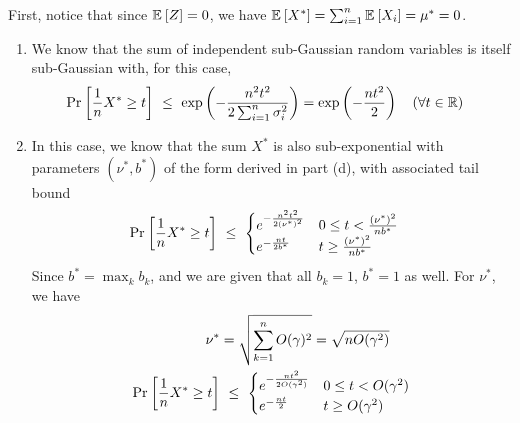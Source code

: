 \documentclass[11pt]{article}
\newcommand{\1}{\mathbb{I}} %
\begin{document}

First, notice that since $\mathbb{E}_{}\left[Z\right] = 0$, we have $\mathbb{E}_{}\left[X^*\right] = \sum_{i=1}^{n} \mathbb{E}_{}\left[X_i\right] = \mu^* = 0$. 

\begin{enumerate}
	\item {} We know that the sum of independent sub-Gaussian random variables is itself sub-Gaussian with, for this case,
	\begin{align}
		\text{Pr}_{}\left[  \frac{1}{n} X^* \geq t \right]
			&~\leq~ \exp\left(    - \frac{n^2t^2}{2\sum_{i=1}^{n} \sigma_i^2}   \right)
			= \exp \left(    - \frac{nt^2}{2 }   \right) \quad (\forall t \in \mathbb{R})
	\end{align}
	
	\item {} In this case, we know that the sum $X^*$ is also sub-exponential with parameters $(\nu^*, b^*)$ of the form derived in part  (d), with associated tail bound
	\begin{align}
		\text{Pr}_{}\left[\frac{1}{n} X^* \geq t\right] 
			&~\leq~ \begin{cases}
				e^{- \frac{n^2t^2}{2 (\nu^*)^2}} & 0 \leq t < \frac{ (\nu^*)^2 }{ n b^*} \\
				e^{-\frac{nt}{2b^*}} & t \geq \frac{ (\nu^*)^2 }{ n b^*}
			\end{cases}
	\end{align}
	Since $b^* = \max_k b_k$, and we are given that all $b_k = 1$, $b^* = 1$ as well. For $\nu^*$, we have
	\begin{align}
		\nu^* &= \sqrt{\sum_{k=1}^{n} O(\gamma)^2} = \sqrt{n O(\gamma ^2)} \\
		\text{Pr}_{}\left[\frac{1}{n} X^* \geq t\right] 
		&~\leq~ \begin{cases}
			e^{- \frac{n t^2}{2O(\gamma^2)}} & 0 \leq t < O(\gamma^2) \\
			e^{-\frac{n t}{2}} & t \geq O(\gamma^2)
		\end{cases}
	\end{align}
\end{enumerate}


\end{document}
